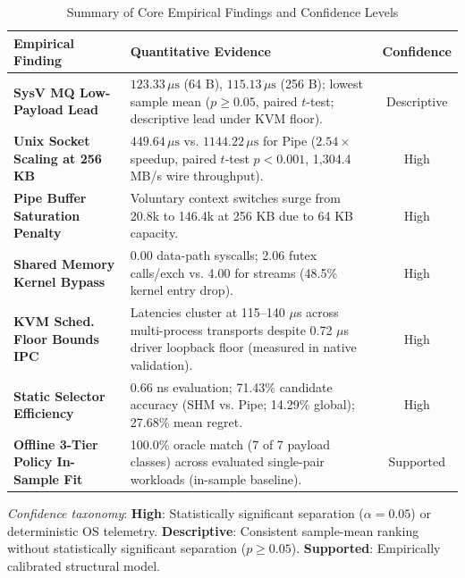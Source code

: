 \begin{table}[!t]
\centering
\caption{Summary of Core Empirical Findings and Confidence Levels}
\label{tab:summary_findings}
\scriptsize
\renewcommand{\arraystretch}{1.02}
\begin{tabular*}{\columnwidth}{@{\extracolsep{\fill}}p{2.6cm}p{3.8cm}c}
\toprule
\textbf{Empirical Finding} & \textbf{Quantitative Evidence} & \textbf{Confidence} \\
\midrule
\textbf{SysV MQ Low-Payload Lead} & $123.33\,\mu\text{s}$ (64 B), $115.13\,\mu\text{s}$ (256 B); lowest sample mean ($p \ge 0.05$, paired $t$-test; descriptive lead under KVM floor). & Descriptive \\
\addlinespace[1.5pt]
\textbf{Unix Socket Scaling at 256 KB} & $449.64\,\mu\text{s}$ vs. $1144.22\,\mu\text{s}$ for Pipe ($2.54\times$ speedup, paired $t$-test $p < 0.001$, 1,304.4 MB/s wire throughput). & High \\
\addlinespace[1.5pt]
\textbf{Pipe Buffer Saturation Penalty} & Voluntary context switches surge from 20.8k to 146.4k at 256 KB due to 64 KB capacity. & High \\
\addlinespace[1.5pt]
\textbf{Shared Memory Kernel Bypass} & 0.00 data-path syscalls; 2.06 futex calls/exch vs. 4.00 for streams (48.5\% kernel entry drop). & High \\
\addlinespace[1.5pt]
\textbf{KVM Sched. Floor Bounds IPC} & Latencies cluster at 115--140 $\mu$s across multi-process transports despite 0.72 $\mu$s driver loopback floor (measured in native validation). & High \\
\addlinespace[1.5pt]
\textbf{Static Selector Efficiency} & 0.66 ns evaluation; 71.43\% candidate accuracy (SHM vs. Pipe; 14.29\% global); 27.68\% mean regret. & High \\
\addlinespace[1.5pt]
\textbf{Offline 3-Tier Policy In-Sample Fit} & 100.0\% oracle match (7 of 7 payload classes) across evaluated single-pair workloads (in-sample baseline). & Supported \\
\bottomrule
\end{tabular*}
\vskip 1.5pt
{\tiny\noindent\emph{Confidence taxonomy}: \textbf{High}: Statistically significant separation ($\alpha = 0.05$) or deterministic OS telemetry. \textbf{Descriptive}: Consistent sample-mean ranking without statistically significant separation ($p \ge 0.05$). \textbf{Supported}: Empirically calibrated structural model.\par}
\end{table}
